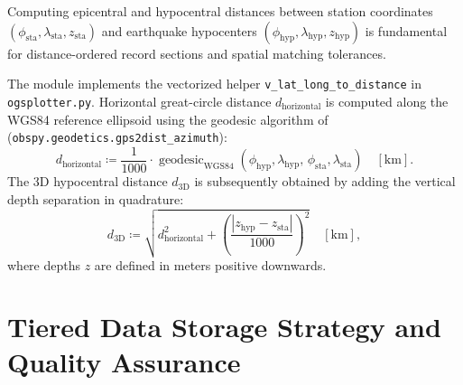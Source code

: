Computing epicentral and hypocentral distances between station
coordinates $(\phi_{\mathrm{sta}}, \lambda_{\mathrm{sta}},
z_{\mathrm{sta}})$ and earthquake hypocenters
$(\phi_{\mathrm{hyp}}, \lambda_{\mathrm{hyp}}, z_{\mathrm{hyp}})$
is fundamental for distance-ordered record sections and spatial
matching tolerances.

The module implements the vectorized helper
\texttt{v\_lat\_long\_to\_distance} in \texttt{ogsplotter.py}.
Horizontal great-circle distance $d_{\mathrm{horizontal}}$ is
computed along the WGS84 reference ellipsoid using the geodesic
algorithm of \textcite{ObsPy} (\texttt{obspy.geodetics.gps2dist\_azimuth}):
\begin{equation}
  d_{\mathrm{horizontal}} \coloneqq \frac{1}{\num{1000}} \cdot
  \operatorname{geodesic}_{\mathrm{WGS84}}\left(\phi_{\mathrm{hyp}},
    \lambda_{\mathrm{hyp}},\, \phi_{\mathrm{sta}},
  \lambda_{\mathrm{sta}}\right) \quad [\unit{\kilo\meter}].
  \label{eq:horizontal_distance}
\end{equation}
The 3D hypocentral distance $d_{3\mathrm{D}}$ is subsequently
obtained by adding the vertical depth separation in quadrature:
\begin{equation}
  d_{3\mathrm{D}} \coloneqq \sqrt{d_{\mathrm{horizontal}}^2 +
    \left(\frac{|z_{\mathrm{hyp}} -
  z_{\mathrm{sta}}|}{\num{1000}}\right)^2} \quad [\unit{\kilo\meter}],
  \label{eq:hypocentral_distance}
\end{equation}
where depths $z$ are defined in meters positive downwards.

\section{Tiered Data Storage Strategy and Quality Assurance}
\label{sec:storage_strategy}

